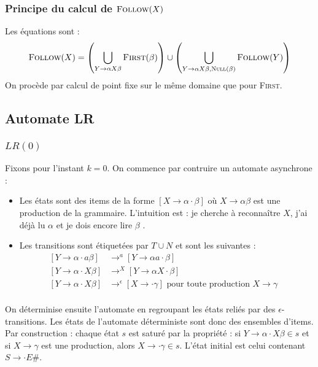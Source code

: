 \documentclass{cours}
\begin{document}
\subsubsection{Principe du calcul de $\textsc{Follow}(X)$}
Les équations sont : 
\[
    \textsc{Follow}(X) = \left(\bigcup_{Y \rightarrow \alpha X\beta} \textsc{First}(\beta)\right) \cup \left(\bigcup_{Y\rightarrow \alpha X \beta, \textsc{Null}(\beta)} \textsc{Follow}(Y)\right)
\]
On procède par calcul de point fixe sur le même domaine que pour \textsc{First}.

\subsection{Automate LR}
\subsubsection{$LR(0)$}
Fixons pour l'instant $k = 0$. On commence par contruire un automate asynchrone :
\begin{itemize}
    \item Les états sont des items de la forme $\left[X \rightarrow \alpha \cdot \beta\right]$ où $X\rightarrow \alpha\beta$ est une production de la grammaire. L'intuition est : \og je cherche à reconnaître $X$, j'ai déjà lu $\alpha$ et je dois encore lire $\beta$ \fg.
    \item Les transitions sont étiquetées par $T \cup N$ et sont les suivantes : 
    \begin{equation*}
        \begin{aligned}
            \left[Y \rightarrow \alpha \cdot a\beta \right] &\rightarrow^{a} \left[Y \rightarrow \alpha a \cdot \beta\right]&\\
            \left[Y \rightarrow \alpha \cdot X\beta \right] &\rightarrow^{X} \left[Y \rightarrow \alpha X \cdot \beta\right]&\\
            \left[Y \rightarrow \alpha \cdot X\beta \right] &\rightarrow^{\epsilon} \left[X \rightarrow \cdot \gamma\right] \text{ pour toute production } X \rightarrow \gamma&\\
        \end{aligned}
    \end{equation*}
\end{itemize}

On déterminise ensuite l'automate en regroupant les états reliés par des $\epsilon$-transitions. Les états de l'automate déterministe sont donc des ensembles d'items.\\
Par construction : chaque état $s$ est saturé par la propriété : si $Y \rightarrow \alpha \cdot X\beta \in s$ et si $X \rightarrow \gamma$ est une production, alors $X \rightarrow \cdot\gamma \in s$. L'état initial est celui contenant $S \rightarrow \cdot E\#$.\\
\end{document}
